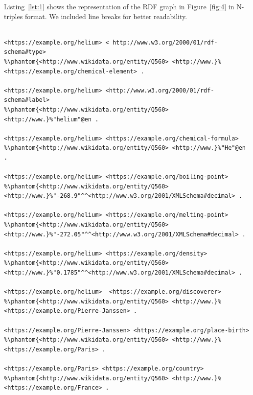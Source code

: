 Listing~\ref{lst:1} shows the representation of the RDF graph in Figure~\ref{fig:4} in N-triples format. We included line breaks for better readability.

\begin{minipage}{\linewidth}
\begin{lstlisting}[columns=fullflexible, label=lst:1, caption={RDF graph represented in N-triples syntax}, language=SPARQL]

<https://example.org/helium> < http://www.w3.org/2000/01/rdf-schema#type>
%\phantom{<http://www.wikidata.org/entity/Q560> <http://www.}%<https://example.org/chemical-element> .
		                                                
<https://example.org/helium> <http://www.w3.org/2000/01/rdf-schema#label> 
%\phantom{<http://www.wikidata.org/entity/Q560> <http://www.}%"helium"@en .

<https://example.org/helium> <https://example.org/chemical-formula> 
%\phantom{<http://www.wikidata.org/entity/Q560> <http://www.}%"He"@en .

<https://example.org/helium> <https://example.org/boiling-point> 
%\phantom{<http://www.wikidata.org/entity/Q560> <http://www.}%"-268.9"^^<http://www.w3.org/2001/XMLSchema#decimal> .

<https://example.org/helium> <https://example.org/melting-point> 
%\phantom{<http://www.wikidata.org/entity/Q560> <http://www.}%"-272.05"^^<http://www.w3.org/2001/XMLSchema#decimal> .

<https://example.org/helium> <https://example.org/density> 
%\phantom{<http://www.wikidata.org/entity/Q560> <http://www.}%"0.1785"^^<http://www.w3.org/2001/XMLSchema#decimal> .

<https://example.org/helium>  <https://example.org/discoverer> 
%\phantom{<http://www.wikidata.org/entity/Q560> <http://www.}%<https://example.org/Pierre-Janssen> .

<https://example.org/Pierre-Janssen> <https://example.org/place-birth> 
%\phantom{<http://www.wikidata.org/entity/Q560> <http://www.}%<https://example.org/Paris> .

<https://example.org/Paris> <https://example.org/country>
%\phantom{<http://www.wikidata.org/entity/Q560> <http://www.}%<https://example.org/France> .

\end{lstlisting}
\end{minipage}

